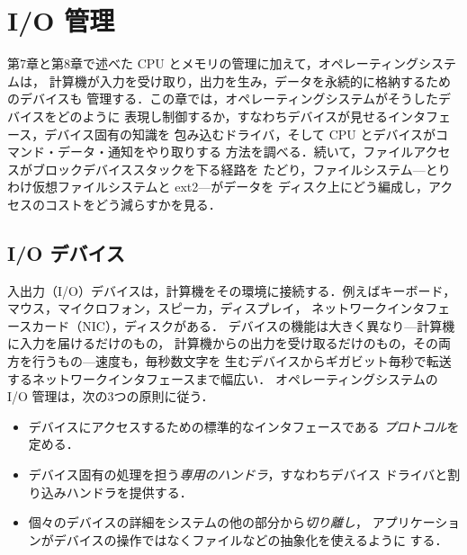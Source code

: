 \documentclass[../main.tex]{subfiles}
\begin{document}
\chapter{I/O 管理}

第7章と第8章で述べた CPU とメモリの管理に加えて，オペレーティングシステムは，
計算機が入力を受け取り，出力を生み，データを永続的に格納するためのデバイスも
管理する．この章では，オペレーティングシステムがそうしたデバイスをどのように
表現し制御するか，すなわちデバイスが見せるインタフェース，デバイス固有の知識を
包み込むドライバ，そして CPU とデバイスがコマンド・データ・通知をやり取りする
方法を調べる．続いて，ファイルアクセスがブロックデバイススタックを下る経路を
たどり，ファイルシステム---とりわけ仮想ファイルシステムと ext2---がデータを
ディスク上にどう編成し，アクセスのコストをどう減らすかを見る．

\section{I/O デバイス}
\label{sec:l11-devices}

入出力（I/O）デバイスは，計算機をその環境に接続する．例えばキーボード，マウス，マイクロフォン，スピーカ，ディスプレイ，
ネットワークインタフェースカード（NIC），ディスクがある．
デバイスの機能は大きく異なり---計算機に入力を届けるだけのもの，
計算機からの出力を受け取るだけのもの，その両方を行うもの---速度も，毎秒数文字を
生むデバイスからギガビット毎秒で転送するネットワークインタフェースまで幅広い．
オペレーティングシステムの I/O 管理は，次の3つの原則に従う．
\begin{itemize}
  \item デバイスにアクセスするための標準的なインタフェースである
    \emph{プロトコル}を定める．
  \item デバイス固有の処理を担う\emph{専用のハンドラ}，すなわちデバイス
    ドライバと割り込みハンドラを提供する．
  \item 個々のデバイスの詳細をシステムの他の部分から\emph{切り離し}，
    アプリケーションがデバイスの操作ではなくファイルなどの抽象化を使えるように
    する．
\end{itemize}
\end{document}
